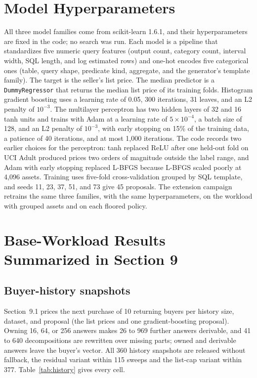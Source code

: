 \documentclass[10pt]{article}
\begin{document}
\section{Model Hyperparameters}
All three model families come from scikit-learn 1.6.1, and their hyperparameters are fixed in the code; no search was run. Each model is a pipeline that standardizes five numeric query features (output count, category count, interval width, SQL length, and log estimated rows) and one-hot encodes five categorical ones (table, query shape, predicate kind, aggregate, and the generator's template family). The target is the seller's list price. The median predictor is a \texttt{DummyRegressor} that returns the median list price of its training folds. Histogram gradient boosting uses a learning rate of 0.05, 300 iterations, 31 leaves, and an L2 penalty of $10^{-3}$. The multilayer perceptron has two hidden layers of 32 and 16 tanh units and trains with Adam at a learning rate of $5 \times 10^{-4}$, a batch size of 128, and an L2 penalty of $10^{-3}$, with early stopping on 15\% of the training data, a patience of 40 iterations, and at most 1{,}000 iterations. The code records two earlier choices for the perceptron: tanh replaced ReLU after one held-out fold on UCI Adult produced prices two orders of magnitude outside the label range, and Adam with early stopping replaced L-BFGS because L-BFGS scaled poorly at 4{,}096 assets. Training uses five-fold cross-validation grouped by SQL template, and seeds 11, 23, 37, 51, and 73 give 45 proposals. The extension campaign retrains the same three families, with the same hyperparameters, on the workload with grouped assets and on each floored policy.

\section{Base-Workload Results Summarized in Section 9}

\subsection{Buyer-history snapshots}
Section~9.1 prices the next purchase of 10 returning buyers per history size, dataset, and proposal (the list prices and one gradient-boosting proposal). Owning 16, 64, or 256 answers makes 26 to 969 further answers derivable, and 41 to 640 decompositions are rewritten over missing parts; owned and derivable answers leave the buyer's vector. All 360 history snapshots are released without fallback, the residual variant within 115 sweeps and the list-cap variant within 377. Table~\ref{tab:history} gives every cell.
\end{document}
